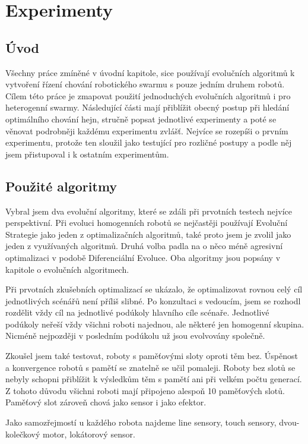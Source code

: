 \chapter{Experimenty}
\section{Úvod}
Všechny práce zmíněné v úvodní kapitole, sice používají evolučních algoritmů k vytvoření řízení chování robotického swarmu s pouze jedním druhem robotů. Cílem této práce je zmapovat použití jednoduchých evolučních algoritmů i pro heterogenní swarmy. Následující části mají přiblížit obecný postup při hledání optimálního chování hejn, stručně popsat jednotlivé experimenty a poté se věnovat podrobněji každému experimentu zvlášť. Nejvíce se rozepíši o prvním experimentu, protože ten sloužil jako testující pro rozličné postupy a podle něj jsem přistupoval i k ostatním experimentům.  

\section{Použité algoritmy}
Vybral jsem dva evoluční algoritmy, které se zdáli při prvotních testech nejvíce perspektivní. Při evoluci homogenních robotů se nejčastěji používají Evoluční Strategie jako jeden z optimalizačních algoritmů, také proto jsem je zvolil jako jeden z využívaných algoritmů. Druhá volba padla na o něco méně agresivní optimalizaci v podobě Diferenciální Evoluce. Oba algoritmy jsou popsány v kapitole o evolučních algoritmech. \par 
Při prvotních zkušebních optimalizací se ukázalo, že optimalizovat rovnou celý cíl jednotlivých scénářů není příliš slibné. Po konzultaci s vedoucím, jsem se rozhodl rozdělit vždy cíl na jednotlivé podúkoly hlavního cíle scénaře. Jednotlivé podúkoly neřeší vždy všichni roboti najednou, ale některé jen homogenní skupina. Nicméně nejpozději v posledním podúkolu už jsou evolvovány společně.
\par
Zkoušel jsem také testovat, roboty s paměťovými sloty oproti těm bez. Úspěnost a konvergence robotů s pamětí se znatelně se učil pomaleji. Roboty bez slotů se nebyly schopni přiblížit k výsledkům těm s pamětí ani při velkém počtu generací. Z tohoto důvodu všichni roboti mají připojeno alespoň 10 paměťových slotů. Paměťový slot zároveň chová jako sensor i jako efektor. 
\par 
Jako samozřejmostí u každého robota najdeme line sensory, touch sensory, dvou-kolečkový motor, lokátorový sensor. \par 

